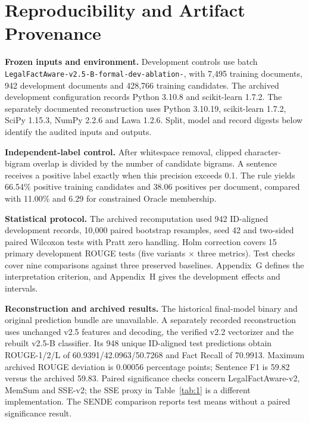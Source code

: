 \documentclass[10pt,twocolumn,letterpaper]{article}
\begin{document}
\section{Reproducibility and Artifact Provenance}\label{appendix-f-reproducibility-and-batch-record}
\textbf{Frozen inputs and environment.} Development controls use batch \texttt{LegalFactAware-\allowbreak v2.5-B-\allowbreak formal-dev-\allowbreak ablation-}, with 7,495 training documents, 942 development documents and 428,766 training candidates. The archived development configuration records Python 3.10.8 and scikit-learn 1.7.2. The separately documented reconstruction uses Python 3.10.19, scikit-learn 1.7.2, SciPy 1.15.3, NumPy 2.2.6 and Lawa 1.2.6. Split, model and record digests below identify the audited inputs and outputs.

\textbf{Independent-label control.} After whitespace removal, clipped character-bigram overlap is divided by the number of candidate bigrams. A sentence receives a positive label exactly when this precision exceeds 0.1. The rule yields 66.54\% positive training candidates and 38.06 positives per document, compared with 11.00\% and 6.29 for constrained Oracle membership.

\textbf{Statistical protocol.} The archived recomputation used 942 ID-aligned development records, 10,000 paired bootstrap resamples, seed 42 and two-sided paired Wilcoxon tests with Pratt zero handling. Holm correction covers 15 primary development ROUGE tests (five variants $\times$ three metrics). Test checks cover nine comparisons against three preserved baselines. Appendix~G defines the interpretation criterion, and Appendix~H gives the development effects and intervals.

\textbf{Reconstruction and archived results.} The historical final-model binary and original prediction bundle are unavailable. A separately recorded reconstruction uses unchanged v2.5 features and decoding, the verified v2.2 vectorizer and the rebuilt v2.5-B classifier. Its 948 unique ID-aligned test predictions obtain ROUGE-1/2/L of 60.9391/42.0963/50.7268 and Fact Recall of 70.9913. Maximum archived ROUGE deviation is 0.00056 percentage points; Sentence F1 is 59.82 versus the archived 59.83. Paired significance checks concern LegalFactAware-v2, MemSum and SSE-v2; the SSE proxy in Table~\ref{tab:1} is a different implementation. The SENDE comparison reports test means without a paired significance result.
\end{document}
